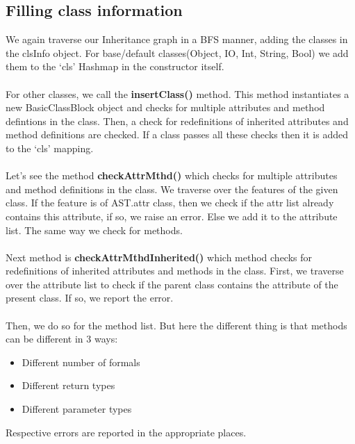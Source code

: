 \documentclass{article}
\begin{document}
\subsection{Filling class information}
We again traverse our Inheritance graph in a BFS manner, adding the classes in the clsInfo object. For base/default classes(Object, IO, Int, String, Bool) we add them to the ‘cls’ Hashmap in the constructor itself. \\ \\
For other classes, we call the \textbf{insertClass()} method. This method instantiates a new BasicClassBlock object and checks for multiple attributes and method defintions in the class. Then, a check for redefinitions of inherited attributes and method definitions are checked. If a class passes all these checks then it is added to the ‘cls’ mapping. \\ \\
Let's see the method \textbf{checkAttrMthd()} which checks for multiple attributes and method definitions in the class. We traverse over the features of the given class. If the feature is of AST.attr class, then we check if the attr list already contains this attribute, if so, we raise an error. Else we add it to the attribute list. The same way we check for methods. \\ \\
Next method is \textbf{checkAttrMthdInherited()} which method checks for redefinitions of inherited attributes and methods in the class. First, we traverse over the attribute list to check if the parent class contains the attribute of the present class. If so, we report the error.\\ \\ 
Then, we do so for the method list. But here the different thing is that methods can be different in 3 ways:
\begin{itemize}
    \item Different number of formals
    \item Different return types
    \item Different parameter types
\end{itemize}
Respective errors are reported in the appropriate places. 
\end{document}
